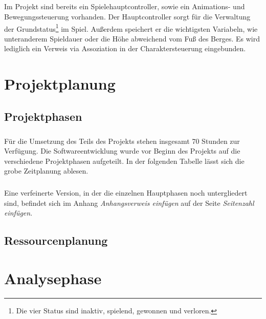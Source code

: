 \paragraph{}
Im Projekt sind bereits ein Spielehauptcontroller, sowie ein Animations- und Bewegungssteuerung vorhanden.
Der Hauptcontroller sorgt für die Verwaltung der Grundstatus\footnote{Die vier Status sind inaktiv, spielend, gewonnen und verloren.} im Spiel. Außerdem speichert er die wichtigsten Variabeln, wie unteranderem Spieldauer oder die Höhe abweichend vom Fuß des Berges. Es wird lediglich ein Verweis via Assoziation in der Charaktersteuerung eingebunden.

\chapter{Projektplanung}
\section{Projektphasen}
\paragraph{}
Für die Umsetzung des Teils des Projekts stehen insgesamt 70 Stunden zur Verfügung. Die Softwareentwicklung wurde vor Beginn des Projekts auf die verschiedene Projektphasen aufgeteilt. In der folgenden Tabelle  lässt sich die grobe Zeitplanung ablesen.\\

\paragraph{}
Eine verfeinerte Version, in der die einzelnen Hauptphasen noch untergliedert sind, befindet sich im Anhang \textit{Anhangsverweis einfügen} auf der Seite \textit{Seitenzahl einfügen}.

\section{Ressourcenplanung}

\chapter{Analysephase}
